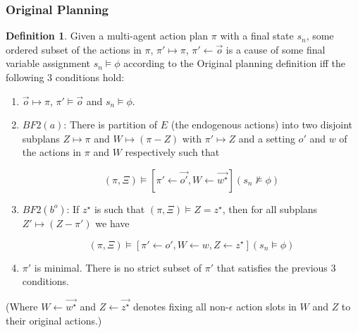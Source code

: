 \documentclass{article}
\theoremstyle{plain}
\theoremstyle{definition}
\newtheorem{defn}[thm]{Definition} %
\begin{document}
\subsubsection*{Original Planning}
\begin{defn}
Given a multi-agent action plan $\pi$ with a final state $s_n$, some ordered subset of the actions in $\pi$, $\pi' \mapsto \pi$, $\pi' \leftarrow \vec{o}$ is a cause of some final variable assignment $s_n \models \phi$ according to the Original planning definition iff the following 3 conditions hold:
\begin{enumerate}
\item  $\vec{o} \mapsto \pi$, $\pi' \models \vec{o}$ and $s_n \models \phi$.



\item $BF2(a)$: There is partition of $E$ (the endogenous actions) into two disjoint subplans $Z \mapsto \pi$ and $W \mapsto (\pi - Z)$ with $\pi' \mapsto Z$ and a setting $o'$ and $w$ of the actions in $\pi$ and $W$ respectively such that

\[
(\pi, \Xi) \models [\pi' \leftarrow \vec{o'}, W \leftarrow \vec{w^\star}](s_n \not\models \phi)
\]

\item $BF2(b^o)$: If $z^\star$ is such that $(\pi, \Xi) \models Z = z^\star$, then for all subplans $Z' \mapsto (Z - \pi')$ we have

\[
(\pi, \Xi) \models [\pi' \leftarrow o', W \leftarrow w, Z \leftarrow z^\star](s_n \models \phi)
\]

\item $\pi'$ is minimal. There is no strict subset of $\pi'$ that satisfies the previous 3 conditions.
\end{enumerate}
\end{defn}

(Where $W\leftarrow \vec{w^\star}$ and $Z\leftarrow \vec{z^\star}$ denotes fixing all non-$\epsilon$ action slots in $W$ and $Z$ to their original actions.)
\end{document}
